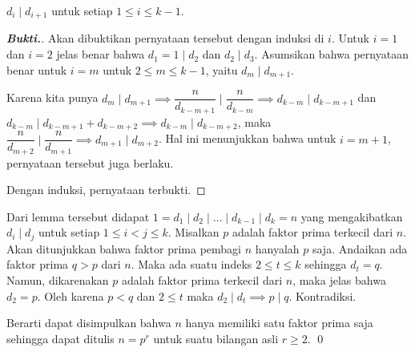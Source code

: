 \begin{lemma*}
$d_i \mid d_{i+1}$ untuk setiap $1 \le i \le k-1$.
\begin{proof}[\textbf{Bukti.}] Akan dibuktikan pernyataan tersebut dengan induksi di $i$. Untuk $i=1$ dan $i=2$ jelas benar bahwa $d_1 = 1 \mid d_2$ dan $d_2 \mid d_3$. Asumsikan bahwa pernyataan benar untuk $i = m$ untuk $2 \le m \le k-1$, yaitu $d_m \mid d_{m+1}$. 

Karena kita punya $d_m \mid d_{m+1} \implies \dfrac{n}{d_{k-m+1}} \mid \dfrac{n}{d_{k-m}} \implies d_{k-m} \mid d_{k-m+1}$ dan  $d_{k-m} \mid d_{k-m+1} + d_{k-m+2} \implies d_{k-m}  \mid d_{k-m+2}$, maka $\dfrac{n}{d_{m+2}} \mid \dfrac{n}{d_{m+1}} \implies d_{m+1} \mid d_{m+2}$. Hal ini menunjukkan bahwa untuk $i=m+1$, pernyataan tersebut juga berlaku. 

Dengan induksi, pernyataan terbukti.
\end{proof}
\end{lemma*}

Dari lemma tersebut didapat $1 = d_1 \mid d_2 \mid \dots \mid d_{k-1} \mid d_k = n$ yang mengakibatkan $d_i \mid d_j$ untuk setiap $1 \le i < j \le k$. Misalkan $p$ adalah faktor prima terkecil dari $n$. Akan ditunjukkan bahwa faktor prima pembagi $n$ hanyalah $p$ saja. Andaikan ada faktor prima $q > p$ dari $n$. Maka ada suatu indeks $2 \le t \le k$ sehingga $d_t = q$. Namun, dikarenakan $p$ adalah faktor prima terkecil dari $n$, maka jelas bahwa $d_2 = p$. Oleh karena $p < q$ dan $2 \le t$ maka $d_2 \mid d_t \implies p \mid q$. Kontradiksi. 

Berarti dapat disimpulkan bahwa $n$ hanya memiliki satu faktor prima saja sehingga dapat ditulis $n = p^r$ untuk suatu bilangan asli $r \ge 2$. \qed
